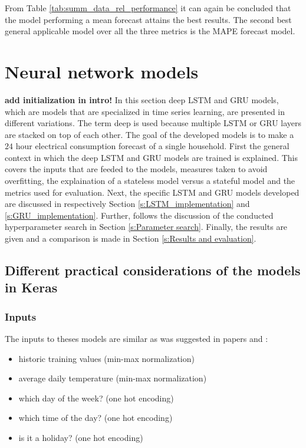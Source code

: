 From Table \ref{tab:summ_data_rel_performance} it can again be concluded that the model performing a mean forecast attains the best results. The second best general applicable model over all the three metrics is the MAPE forecast model.


\section{Neural network models}\label{s:Neural network models}
\textbf{add initialization in intro!}
In this section deep LSTM and GRU models, which are models that are specialized in time series learning, are presented in different variations. The term deep is used because multiple LSTM or GRU layers are stacked on top of each other. The goal of the developed models is to make a $ 24 $ hour electrical consumption forecast of a single household. First the general context in which the deep LSTM and GRU models are trained is explained. This covers the inputs that are feeded to the models, measures taken to avoid overfitting, the explaination of a stateless model versus a stateful model and the metrics used for evaluation. Next, the specific LSTM and GRU models developed are discussed in respectively Section \ref{s:LSTM_implementation} and \ref{s:GRU_implementation}. Further, follows  the discussion of the conducted hyperparameter search in Section \ref{s:Parameter search}. Finally, the results are given and a comparison is made in Section \ref{s:Results and evaluation}.

\subsection{Different practical considerations of the models in Keras}

\subsubsection{Inputs}
The inputs to theses models are similar as was suggested in papers \cite{loadforecastingmoor} and \cite{Kong2019}: 
\begin{itemize}
	\item historic training values (min-max normalization)
	\item average daily temperature (min-max normalization)
	\item which day of the week? (one hot encoding)
	\item which time of the day? (one hot encoding)
	\item is it a holiday? (one hot encoding)
\end{itemize}

